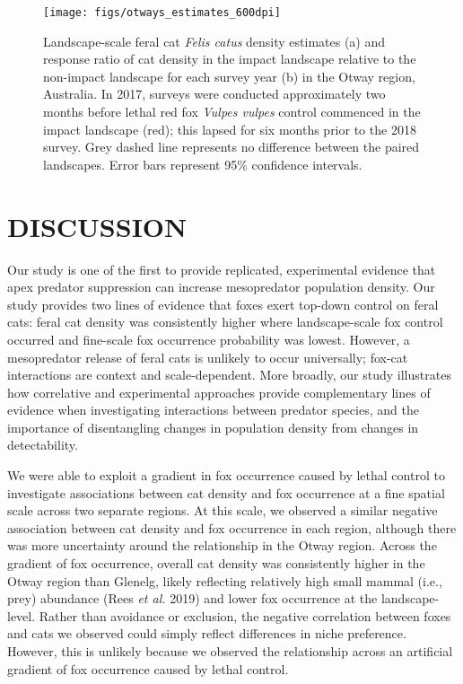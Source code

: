 \documentclass[]{elsarticle} %
\begin{document}
\newpage

\begin{figure}
\texttt{[image: figs/otways\_estimates\_600dpi]} \caption{Landscape-scale feral cat \textit{Felis catus} density estimates (a) and response ratio of cat density in the impact landscape relative to the non-impact landscape for each survey year (b) in the Otway region, Australia. In 2017, surveys were conducted approximately two months before lethal red fox \textit{Vulpes vulpes} control commenced in the impact landscape (red); this lapsed for six months prior to the 2018 survey. Grey dashed line represents no difference between the paired landscapes. Error bars represent 95\% confidence intervals.}\label{fig:diffo}
\end{figure}

\newpage

\hypertarget{discussion}{%
\section{DISCUSSION}\label{discussion}}

Our study is one of the first to provide replicated, experimental evidence that apex predator suppression can increase mesopredator population density. Our study provides two lines of evidence that foxes exert top-down control on feral cats: feral cat density was consistently higher where landscape-scale fox control occurred and fine-scale fox occurrence probability was lowest. However, a mesopredator release of feral cats is unlikely to occur universally; fox-cat interactions are context and scale-dependent. More broadly, our study illustrates how correlative and experimental approaches provide complementary lines of evidence when investigating interactions between predator species, and the importance of disentangling changes in population density from changes in detectability.

We were able to exploit a gradient in fox occurrence caused by lethal control to investigate associations between cat density and fox occurrence at a fine spatial scale across two separate regions. At this scale, we observed a similar negative association between cat density and fox occurrence in each region, although there was more uncertainty around the relationship in the Otway region. Across the gradient of fox occurrence, overall cat density was consistently higher in the Otway region than Glenelg, likely reflecting relatively high small mammal (i.e., prey) abundance (Rees \emph{et al.} 2019) and lower fox occurrence at the landscape-level. Rather than avoidance or exclusion, the negative correlation between foxes and cats we observed could simply reflect differences in niche preference. However, this is unlikely because we observed the relationship across an artificial gradient of fox occurrence caused by lethal control.
\end{document}
